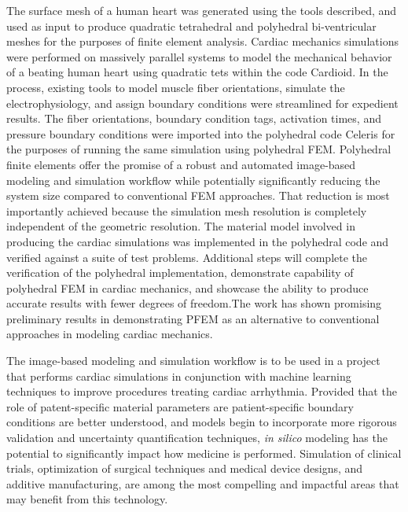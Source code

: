 The surface mesh of a human heart was generated using the tools described, and used as input to produce quadratic tetrahedral and polyhedral bi-ventricular meshes for the purposes of finite element analysis. Cardiac mechanics simulations were performed on massively parallel systems to model the mechanical behavior of a beating human heart using quadratic tets within the code Cardioid. In the process, existing tools to model muscle fiber orientations, simulate the electrophysiology, and assign boundary conditions were streamlined for expedient results. The fiber orientations, boundary condition tags, activation times, and pressure boundary conditions were imported into the polyhedral code Celeris for the purposes of running the same simulation using polyhedral FEM. Polyhedral finite elements offer the promise of a robust and automated image-based modeling and simulation workflow while potentially significantly reducing the system size compared to conventional FEM approaches. That reduction is most importantly achieved because the simulation mesh resolution is completely independent of the geometric resolution. The material model involved in producing the cardiac simulations was implemented in the polyhedral code and verified against a suite of test problems. Additional steps will complete the verification of the polyhedral implementation, demonstrate capability of polyhedral FEM in cardiac mechanics, and showcase the ability to produce accurate results with fewer degrees of freedom.The work has shown promising preliminary results in demonstrating PFEM as an alternative to conventional approaches in modeling cardiac mechanics.

The image-based modeling and simulation workflow is to be used in a project that performs cardiac simulations in conjunction with machine learning techniques to improve procedures treating cardiac arrhythmia. Provided that the role of patent-specific material parameters are patient-specific boundary conditions are better understood, and models begin to incorporate more rigorous validation and uncertainty quantification techniques, \textit{in silico} modeling has the potential to significantly impact how medicine is performed. Simulation of clinical trials, optimization of surgical techniques and medical device designs, and additive manufacturing, are among the most compelling and impactful areas that may benefit from this technology.